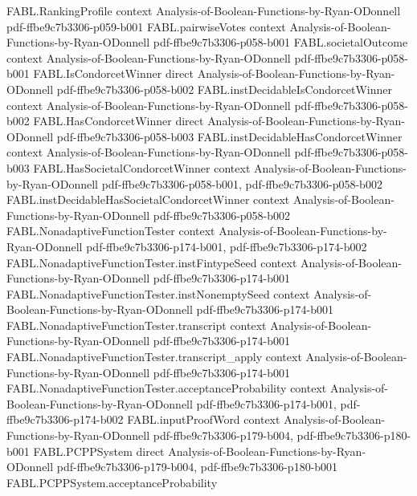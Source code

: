 \begin{theorem}
\proofstep
  {FABL.RankingProfile}
  {context}
  {Analysis-of-Boolean-Functions-by-Ryan-ODonnell}
  {pdf-ffbe9c7b3306-p059-b001}
\proofstep
  {FABL.pairwiseVotes}
  {context}
  {Analysis-of-Boolean-Functions-by-Ryan-ODonnell}
  {pdf-ffbe9c7b3306-p058-b001}
\proofstep
  {FABL.societalOutcome}
  {context}
  {Analysis-of-Boolean-Functions-by-Ryan-ODonnell}
  {pdf-ffbe9c7b3306-p058-b001}
\proofstep
  {FABL.IsCondorcetWinner}
  {direct}
  {Analysis-of-Boolean-Functions-by-Ryan-ODonnell}
  {pdf-ffbe9c7b3306-p058-b002}
\proofstep
  {FABL.instDecidableIsCondorcetWinner}
  {context}
  {Analysis-of-Boolean-Functions-by-Ryan-ODonnell}
  {pdf-ffbe9c7b3306-p058-b002}
\proofstep
  {FABL.HasCondorcetWinner}
  {direct}
  {Analysis-of-Boolean-Functions-by-Ryan-ODonnell}
  {pdf-ffbe9c7b3306-p058-b003}
\proofstep
  {FABL.instDecidableHasCondorcetWinner}
  {context}
  {Analysis-of-Boolean-Functions-by-Ryan-ODonnell}
  {pdf-ffbe9c7b3306-p058-b003}
\proofstep
  {FABL.HasSocietalCondorcetWinner}
  {context}
  {Analysis-of-Boolean-Functions-by-Ryan-ODonnell}
  {pdf-ffbe9c7b3306-p058-b001,
    pdf-ffbe9c7b3306-p058-b002}
\proofstep
  {FABL.instDecidableHasSocietalCondorcetWinner}
  {context}
  {Analysis-of-Boolean-Functions-by-Ryan-ODonnell}
  {pdf-ffbe9c7b3306-p058-b002}
\proofstep
  {FABL.NonadaptiveFunctionTester}
  {context}
  {Analysis-of-Boolean-Functions-by-Ryan-ODonnell}
  {pdf-ffbe9c7b3306-p174-b001,
    pdf-ffbe9c7b3306-p174-b002}
\proofstep
  {FABL.NonadaptiveFunctionTester.instFintypeSeed}
  {context}
  {Analysis-of-Boolean-Functions-by-Ryan-ODonnell}
  {pdf-ffbe9c7b3306-p174-b001}
\proofstep
  {FABL.NonadaptiveFunctionTester.instNonemptySeed}
  {context}
  {Analysis-of-Boolean-Functions-by-Ryan-ODonnell}
  {pdf-ffbe9c7b3306-p174-b001}
\proofstep
  {FABL.NonadaptiveFunctionTester.transcript}
  {context}
  {Analysis-of-Boolean-Functions-by-Ryan-ODonnell}
  {pdf-ffbe9c7b3306-p174-b001}
\proofstep
  {FABL.NonadaptiveFunctionTester.transcript_apply}
  {context}
  {Analysis-of-Boolean-Functions-by-Ryan-ODonnell}
  {pdf-ffbe9c7b3306-p174-b001}
\proofstep
  {FABL.NonadaptiveFunctionTester.acceptanceProbability}
  {context}
  {Analysis-of-Boolean-Functions-by-Ryan-ODonnell}
  {pdf-ffbe9c7b3306-p174-b001,
    pdf-ffbe9c7b3306-p174-b002}
\proofstep
  {FABL.inputProofWord}
  {context}
  {Analysis-of-Boolean-Functions-by-Ryan-ODonnell}
  {pdf-ffbe9c7b3306-p179-b004,
    pdf-ffbe9c7b3306-p180-b001}
\proofstep
  {FABL.PCPPSystem}
  {direct}
  {Analysis-of-Boolean-Functions-by-Ryan-ODonnell}
  {pdf-ffbe9c7b3306-p179-b004,
    pdf-ffbe9c7b3306-p180-b001}
\proofstep
  {FABL.PCPPSystem.acceptanceProbability}

\end{theorem}
